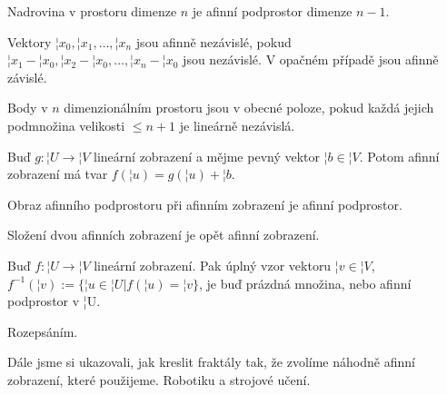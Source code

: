 \documentclass[12pt]{article}					%
\begin{document}
    \begin{definice}[Nadrovina]
        Nadrovina v prostoru dimenze $n$ je afinní podprostor dimenze $n - 1$.
    \end{definice}

    \begin{definice}
        Vektory $¦x_0, ¦x_1, …, ¦x_n$ jsou afinně nezávislé, pokud $¦x_1 - ¦x_0, ¦x_2 - ¦x_0, …, ¦x_n - ¦x_0$ jsou nezávislé. V opačném případě jsou afinně závislé.
    \end{definice}

    \begin{poznamka}
        Body v $n$ dimenzionálním prostoru jsou v obecné poloze, pokud každá jejich podmnožina velikosti $≤n+1$ je lineárně nezávislá.
    \end{poznamka}

    \begin{definice}
        Buď $g: ¦U \rightarrow ¦V$ lineární zobrazení a mějme pevný vektor $¦b \in ¦V$. Potom afinní zobrazení má tvar $f(¦u) = g(¦u) + ¦b$.
    \end{definice}

    \begin{tvrzeni}
        Obraz afinního podprostoru při afinním zobrazení je afinní podprostor.

        Složení dvou afinních zobrazení je opět afinní zobrazení.
    \end{tvrzeni}

    \begin{tvrzeni}
        Buď $f: ¦U \rightarrow ¦V$ lineární zobrazení. Pak úplný vzor vektoru $¦v \in ¦V$, $f^{-1}(¦v) := \{¦u \in ¦U| f(¦u) = ¦v\}$, je buď prázdná množina, nebo afinní podprostor v ¦U.

        \begin{dukazin}
            Rozepsáním.
        \end{dukazin}
    \end{tvrzeni}

    \begin{poznamka}
        Dále jsme si ukazovali, jak kreslit fraktály tak, že zvolíme náhodně afinní zobrazení, které použijeme. Robotiku a strojové učení.
    \end{poznamka}
\end{document}

